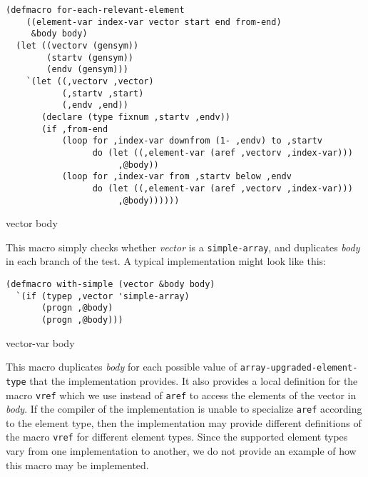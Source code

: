 {\small\begin{verbatim}
(defmacro for-each-relevant-element
    ((element-var index-var vector start end from-end)
     &body body)
  (let ((vectorv (gensym))
        (startv (gensym))
        (endv (gensym)))
    `(let ((,vectorv ,vector)
           (,startv ,start)
           (,endv ,end))
       (declare (type fixnum ,startv ,endv))
       (if ,from-end
           (loop for ,index-var downfrom (1- ,endv) to ,startv
                 do (let ((,element-var (aref ,vectorv ,index-var)))
                      ,@body))
           (loop for ,index-var from ,startv below ,endv
                 do (let ((,element-var (aref ,vectorv ,index-var)))
                      ,@body))))))
\end{verbatim}}

 {vector \body body}

This macro simply checks whether \textit{vector} is a
\texttt{simple-array}, and duplicates \textit{body} in each branch of
the test.  A typical implementation might look like this:

{\small\begin{verbatim}
(defmacro with-simple (vector &body body)
  `(if (typep ,vector 'simple-array)
       (progn ,@body)
       (progn ,@body)))
\end{verbatim}}

 {vector-var \body body}

This macro duplicates \textit{body} for each possible value of
\texttt{array-upgraded-element-type} that the implementation provides.
It also provides a local definition for the macro \texttt{vref} which
we use instead of \texttt{aref} to access the elements of the vector
in \textit{body}.  If the compiler of the implementation is unable to
specialize \texttt{aref} according to the element type, then the
implementation may provide different definitions of the macro
\texttt{vref} for different element types.  Since the supported
element types vary from one implementation to another, we do not
provide an example of how this macro may be implemented.
